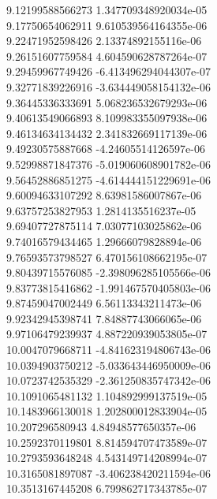 {9.12199588566273 1.347709348920034e-05
 \\
9.17750654062911 9.610539564164355e-06
 \\
9.22471952598426 2.13374892155116e-06
 \\
9.26151607759584 4.604590628787264e-07
 \\
9.29459967749426 -6.413496294044307e-07
 \\
9.32771839226916 -3.634449058154132e-06
 \\
9.36445336333691 5.068236532679293e-06
 \\
9.40613549066893 8.109983355097938e-06
 \\
9.46134634134432 2.341832669117139e-06
 \\
9.49230575887668 -4.24605514126597e-06
 \\
9.52998871847376 -5.019060608901782e-06
 \\
9.56452886851275 -4.614444151229691e-06
 \\
9.60094633107292 8.63981586007867e-06
 \\
9.63757253827953 1.2814135516237e-05
 \\
9.69407727875114 7.03077103025862e-06
 \\
9.74016579434465 1.29666079828894e-06
 \\
9.76593573798527 6.470156108662195e-07
 \\
9.80439715576085 -2.398096285105566e-06
 \\
9.83773815416862 -1.991467570405803e-06
 \\
9.87459047002449 6.56113343211473e-06
 \\
9.92342945398741 7.84887743066065e-06
 \\
9.97106479239937 4.887220939053805e-07
 \\
10.0047079668711 -4.841623194806743e-06
 \\
10.0394903750212 -5.033643446950009e-06
 \\
10.0723742535329 -2.361250835747342e-06
 \\
10.1091065481132 1.104892999137519e-05
 \\
10.1483966130018 1.202800012833904e-05
 \\
10.207296580943 4.84948577650357e-06
 \\
10.2592370119801 8.814594707473589e-07
 \\
10.2793593648248 4.543149714208994e-07
 \\
10.3165081897087 -3.406238420211594e-06
 \\
10.3513167445208 6.799862717343785e-07
}
